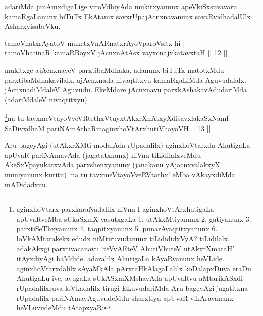 \begin{artha}
adariMda janAmxdigaLige viroVdhiyAda mukitxyanunx apeVkiSxsuvavaru 
kamaRgaLanunx biTuTx EkAtamx savxrUpajAcnxnavanunx savaRvidhadalUlx 
AsharxyisabeVku.
\end{artha}


\begin{shl}
tamoVnatxrAyatoV muketxVnARnatxrAyoV\s paroV\s sitx hi | \\
tamoVhatinaR kamaRBoyxV jAcnxnAtAsx vayxcnajxkatavxtaH \hfill|| 12 || 
\end{shl}

\begin{artha}
mukitxge ajAcnxnaveV parxtibaMdhaka. adanunx biTuTx matotxMdu parxtibaMdhakavilalx. ajAcnxnada nivaqtitxyu kamaRgaLiMda Aguvudalalx. jAcnxnadiMdaleV Aguvudu. EkeMdare jAcnxnavu parxkAshakavAdudariMda (adariMdaleV nivaqtitxyu).
\end{artha}



\begin{shl}
\footnote{aginxhoVtarx parxkaraNadalilx niVnu I  aginxhoVtArxhutigaLa apUvaRveMba sUkaSxmX vasutxgaLa 1. utAkxMtiyanunx  2. gatiyanunx 3. parxtiSeThxyanunx 4. taqpitxyanunx 5.  punarAvaqtitxyanunx 6. loVkAMtarakekx edudx niMtiruvudanunx  tiLidididxVyA? tiLidilalx. adakAkxgi parxtivacanavu `teVvAEteV  AhutiVhuteV utAkxrXmataH' itAyxdiyAgi baMdide. adaralilx AhutigaLa  kAyaRvanunx heVLide. aginxhoVtarxdalilx sAyaMkAla pArxtaHkAlagaLalilx  koDalapxDuva eraDu AhutigaLu ive. avugaLa sUkASxmXMshavAda apUvaRvu  aMtarikASxdi rUpadalilxruva loVkadalilx tirugi ELuvudariMda Aru  bageyAgi jagatitxna rUpadalilx pariNAmavAguvudeMdu shurxtiyu apUvaR  vikAravanunx heVLuvudeMdu tAtapxyaR:}na tu tavxmeVtayoVveVRtethxVtuyxtAkxrXnAtxyXdisavxlakaSxNamf | \\
SaDivxdhaM pariNAmAthaRmaginxhoVtArxhutiVhayoVH \hfill|| 13 || 
\end{shl}

\begin{artha}
Aru bageyAgi (utAkxrXMti modalAda rUpadalilx) aginxhoVtarxda AhutigaLa 
apUvaR pariNAmavAda (jagatatxnunx) niVnu tiLidilalxveMdu 
AkeSxVpayukatxvAda parxshenxyanunx (janakanu yAjacnxvalakxyX 
muniyanunx kuritu) `na tu tavxmeVtayoVveRVtathx' eMba vAkayxdiMda 
mADidadxnu.
\end{artha}


